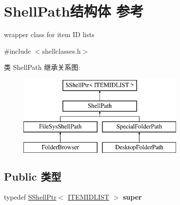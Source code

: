 \hypertarget{struct_shell_path}{}\section{Shell\+Path结构体 参考}
\label{struct_shell_path}


wrapper class for item ID lists  




{\ttfamily \#include $<$shellclasses.\+h$>$}

类 Shell\+Path 继承关系图\+:\begin{figure}[H]
\begin{center}
\leavevmode
\includegraphics[height=4.000000cm]{struct_shell_path}
\end{center}
\end{figure}
\subsection*{Public 类型}
\begin{DoxyCompactItemize}
\item 
\mbox{\label{struct_shell_path_a0cab4e43a0a7759969f41150e41a9d84}} 
typedef \hyperlink{struct_s_shell_ptr}{S\+Shell\+Ptr}$<$ \hyperlink{struct___i_t_e_m_i_d_l_i_s_t}{I\+T\+E\+M\+I\+D\+L\+I\+ST} $>$ {\bfseries super}
\end{DoxyCompactItemize}
